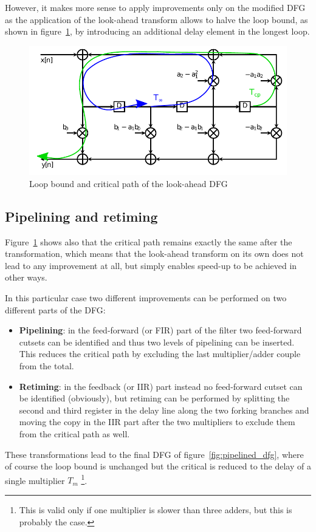 \documentclass[a4paper]{article}
\begin{document}
However, it makes more sense to apply improvements only on the modified DFG as the application of the look-ahead transform allows to halve the loop bound, as shown in figure~\ref{fig:lookahead_dfg_lbcp}, by introducing an additional delay element in the longest loop. 

\begin{figure}[hbtp]
    \centering
    \includegraphics[width=.9\linewidth]{media/lookahead_dfg_lbcp.pdf}
    \caption{Loop bound and critical path of the look-ahead DFG}
    \label{fig:lookahead_dfg_lbcp}
\end{figure}

\subsection{Pipelining and retiming}
Figure~\ref{fig:lookahead_dfg_lbcp} shows also that the critical path remains exactly the same after the transformation, which means that the look-ahead transform on its own does not lead to any improvement at all, but simply enables speed-up to be achieved in other ways. 

In this particular case two different improvements can be performed on two different parts of the DFG:
\begin{itemize}
    \item \textbf{Pipelining}: in the feed-forward (or FIR) part of the filter two feed-forward cutsets can be identified and thus two levels of pipelining can be inserted. This reduces the critical path by excluding the last multiplier/adder couple from the total.
    \item \textbf{Retiming}: in the feedback (or IIR) part instead no feed-forward cutset can be identified (obviously), but retiming can be performed by splitting the second and third register in the delay line along the two forking branches and moving the copy in the IIR part after the two multipliers to exclude them from the critical path as well.
\end{itemize}
These transformations lead to the final DFG of figure~\ref{fig:pipelined_dfg}, where of course the loop bound is unchanged but the critical is reduced to the delay of a single multiplier $T_m$ \footnote{This is valid only if one multiplier is slower than three adders, but this is probably the case.}.
\end{document}
